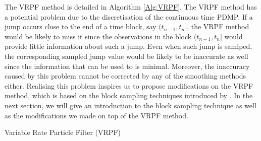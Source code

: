 \documentclass[12pt,a4paper]{article}
\begin{document}
The VRPF method is detailed in Algorithm \ref{Alg:VRPF}. The VRPF method has a potential problem due to the discretisation of the continuous time PDMP. If a jump occurs close to the end of a time block, say \((t_{n-1},t_n]\), the VRPF method would be likely to miss it since the observations in the block \((t_{n-1},t_n]\) would provide little information about such a jump. Even when such jump is samlped, the corresponding sampled jump value would be likely to be inaccurate as well since the information that can be used to is minimal. Moreover, the inaccuracy caused by this problem cannot be corrected by any of the smoothing methods either. Realising this problem inspires us to propose modifications on the VRPF method, which is based on the block sampling techniques introduced by \cite{doucet2006efficient}. In the next section, we will give an introduction to the block sampling technique as well as the modifications we made on top of the VRPF method. 
\begin{algorithm}
    \caption{Variable Rate Particle Filter (VRPF)}\label{Alg:VRPF}
\end{algorithm}
\end{document}
